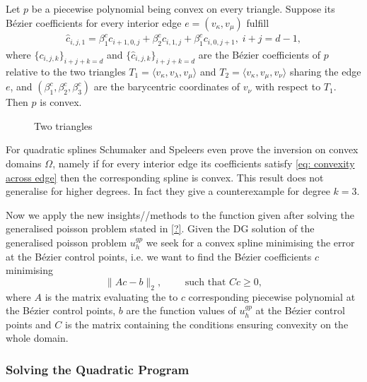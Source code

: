 \begin{theorem}
	Let $p$ be a piecewise polynomial being convex on every triangle. Suppose its B\'ezier coefficients for every interior edge $e =(v_\kappa, v_\mu)$ fulfill 
	\begin{align}
		{\hat c_{i,j,1}} = \beta_1^c c_{i+1, 0,j} +\beta_2^c c_{i,1,j} + \beta_1^c c_{i, 0,j+1}, \; i+j=d-1, \label{eq: convexity across edge}
	\end{align}
where  $\{c_{i,j,k}\}_{i+j+k=d}$ and $\{ {\hat c_{i,j,k}}\}_{i+j+k=d}$ are the B\'ezier coefficients of $p$ relative to the two triangles $T_1 = \langle v_\kappa, v_\lambda, v_\mu \rangle$ and $T_2 = \langle v_\kappa, v_\mu, v_\nu \rangle$ sharing the edge $e$, and $(\beta_1^c,\beta_2^c,\beta_3^c)$ are the barycentric coordinates of $v_\nu$ with respect to $T_1$. Then $p$ is convex.
\end{theorem}

\begin{figure}[h]
	
	\caption{Two triangles}
\end{figure}

For quadratic splines Schumaker and Speleers even prove the inversion on convex domains $\Omega$, namely if for every interior edge its coefficients satisfy \eqref{eq: convexity across edge} then the corresponding spline is convex.
This result does not generalise for higher degrees. In fact they give a counterexample for degree $k = 3$.

Now we apply the new insights//methods to the function given after solving the generalised poisson problem stated in \ref{?}.
Given the DG solution of the generalised poisson problem $u^{gp}_h$ we seek for a convex spline minimising the error at the B\'ezier control points, i.e. we want to find the B\'ezier coefficients $c$ minimising
\[
		\lVert A c - b \rVert_2, \qquad \text{ such that } Cc \geq 0,
\]
where $A$ is the matrix evaluating the to $c$ corresponding piecewise polynomial at the B\'ezier control points, $b$ are the function values of $u^{gp}_h$ at the B\'ezier control points and $C$ is the matrix containing the conditions ensuring convexity on the whole domain.

\subsubsection{Solving the Quadratic Program}

